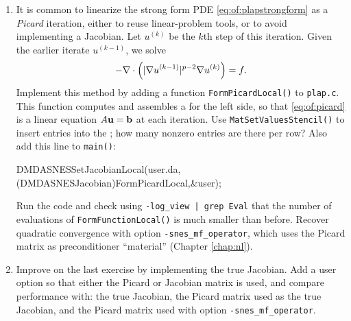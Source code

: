 \begin{enumerate}
\item \label{exer:of:picardimplementation}  It is common to linearize the strong form PDE \eqref{eq:of:plapstrongform} as a \emph{Picard} iteration, either to reuse linear-problem tools, or to avoid implementing a Jacobian.  Let $u^{(k)}$ be the $k$th step of this iteration.  Given the earlier iterate $u^{(k-1)}$, we solve
\begin{equation}
- \nabla\cdot\left(|\nabla u^{(k-1)}|^{p-2} \nabla u^{(k)}\right) = f.
\label{eq:of:picard}
\end{equation}
Implement this method by adding a function \texttt{FormPicardLocal()} to \texttt{plap.c}.  This function computes and assembles a \pMat for the left side, so that \eqref{eq:of:picard} is a linear equation $A\mathbf{u} = \mathbf{b}$ at each iteration.  Use \texttt{MatSetValuesStencil()} to insert entries into the \pMat; how many nonzero entries are there per row?  Also add this line to \texttt{main()}:
\begin{code}
    DMDASNESSetJacobianLocal(user.da,
            (DMDASNESJacobian)FormPicardLocal,&user);
\end{code}
Run the code and check using \texttt{-log\_view | grep Eval} that the number of evaluations of \texttt{FormFunctionLocal()} is much smaller than before.  Recover quadratic convergence with option \texttt{-snes\_mf\_operator}, which uses the Picard matrix as preconditioner ``material'' (Chapter \ref{chap:nl}).

\item \label{exer:of:jacobianimplementation}  Improve on the last exercise by implementing the true Jacobian.  Add a user option so that either the Picard or Jacobian matrix is used, and compare performance with: the true Jacobian, the Picard matrix used as the true Jacobian, and the Picard matrix used with option \texttt{-snes\_mf\_operator}.

\end{enumerate}


